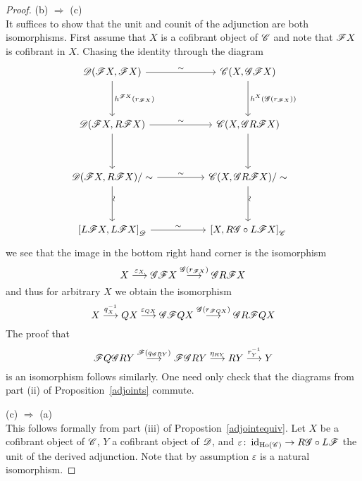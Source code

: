 \documentclass[10pt]{amsart}
\begin{document}
\begin{prop}
\begin{proof}
    (b) $\Rightarrow$ (c)\\
    It suffices to show that the unit and counit of the adjunction are both isomorphisms.
    First assume that $X$ is a cofibrant object of $\mathscr{C}$ and note that $\mathscr{F} X$ is cofibrant in $X$.
    Chasing the identity through the diagram
    $$\begin{tikzcd}
      \D(\F X, \F X) \arrow{rr}{\sim}\arrow{dd}{h^{\F X}(r_{\F X})} && \C(X, \G \F X) \arrow{dd}{h^{X}(\G(r_{\F X}))}\\
      \\
      \D(\F X, R \F X) \arrow{dd}\arrow{rr}{\sim} && \C(X, \G R \F X)\arrow{dd}\\
      \\
      \D(\F X, R \F  X)/\sim \arrow{rr}{\sim}\arrow{dd}[rotate=90,yshift=-0.5ex]{\sim} && \C(X,\G R \F  X)/\sim\arrow{dd}[rotate=90,yshift=-0.5ex]{\sim}\\
      \\
      \left[L\F X, L\F X\right]_\D \arrow{rr}{\sim} && \left[X, R\G \circ L\F X\right]_\C
    \end{tikzcd}$$
    we see that the image in the bottom right hand corner is the isomorphism
    $$X \overset{\varepsilon_X}\longrightarrow \mathscr{G} \mathscr{F} X \overset{\mathscr{G}(r_{\mathscr{F} X})}\longrightarrow \mathscr{G} R \mathscr{F} X$$
    and thus for arbitrary $X$ we obtain the isomorphism 
    $$X \overset{q_X^{-1}}\longrightarrow QX \overset{\varepsilon_{QX}}\longrightarrow \mathscr{G} \mathscr{F} QX \overset{\mathscr{G}(r_{\mathscr{F} QX})}\longrightarrow \mathscr{G} R \mathscr{F} QX$$
    The proof that 
    $$\mathscr{F} Q \mathscr{G} R Y \overset{\mathscr{F}(q_{\mathscr{G} R Y})}\longrightarrow \mathscr{F} \mathscr{G} R Y \overset{\eta_{RY}}\longrightarrow RY \overset{r_Y^{-1}}\longrightarrow Y$$
    is an isomorphism follows similarly.
    One need only check that the diagrams from part (ii) of Proposition~\ref{adjoints} commute.
    
    (c) $\Rightarrow$ (a)\\
    This follows formally from part (iii) of Propostion~\ref{adjointequiv}.
    Let $X$ be a cofibrant object of $\mathscr{C}$, $Y$ a cofibrant object of $\mathscr{D}$, and $\varepsilon \colon \operatorname{id}_{\operatorname{Ho}\left(\mathscr{C}\right)} \to R\mathscr{G} \circ L\mathscr{F}$ the unit of the derived adjunction.
    Note that by assumption $\varepsilon$ is a natural isomorphism.
    

\end{proof}
\end{prop}
\end{document}
